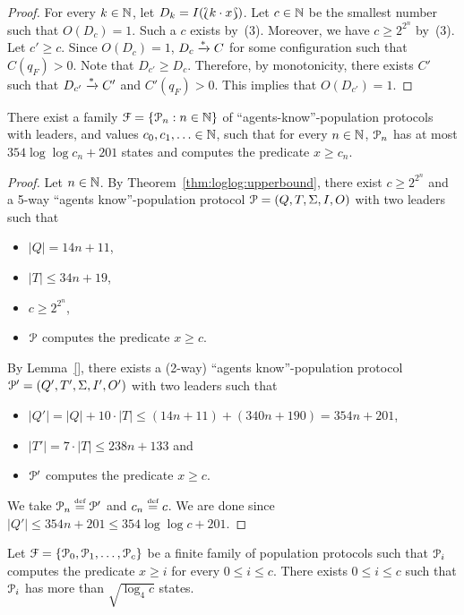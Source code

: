 \begin{proof}
  For every $k \in \mathbb{N}$, let $D_k = I(\Lbag k \cdot x\Rbag)$. Let $c
  \in \mathbb{N}$ be the smallest number such that $O(D_c) = 1$. Such a $c$
  exists by~(3). Moreover, we have $c \geq 2^{2^n}$ by~(3). Let $c'
  \geq c$. Since $O(D_c) = 1$, $D_c \xrightarrow{*} C$ for some
  configuration such that $C(q_F) > 0$. Note that $D_{c'} \geq
  D_c$. Therefore, by monotonicity, there exists $C'$ such that
  $D_{c'} \xrightarrow{*} C'$ and $C'(q_F) > 0$. This implies that
  $O(D_{c'}) = 1$.
\end{proof}

\begin{corollary}
  There exist a family $\mathcal{F} = \{\mathcal{P}_n : n \in \mathbb{N}\}$ of
  ``agents-know''-population protocols with leaders, and values $c_0,
  c_1, \ldots \in \mathbb{N}$, such that for every $n \in \mathbb{N}$, $\mathcal{P}_n$ has at
  most $354 \log\log c_n + 201$ states and computes the predicate $x
  \geq c_n$.
\end{corollary}

\begin{proof}
  Let $n \in \mathbb{N}$. By Theorem~\ref{thm:loglog:upperbound}, there exist
  $c \geq 2^{2^n}$ and a 5-way ``agents know''-population protocol
  $\mathcal{P} = (Q, T, \Sigma, I, O)$ with two leaders such that
  \begin{itemize}
    \item $|Q| = 14n + 11$,
    \item $|T| \leq 34n + 19$,
    \item $c \geq 2^{2^n}$,
    \item $\mathcal{P}$ computes the predicate $x \geq c$.
  \end{itemize}
  By Lemma~\ref{}, there exists a (2-way) ``agents know''-population
  protocol $\mathcal{P}' = (Q', T', \Sigma, I', O')$ with two leaders such
  that
  \begin{itemize}
  \item $|Q'| = |Q| + 10 \cdot |T| \leq (14n + 11) + (340n + 190) =
    354n + 201$,
  \item $|T'| = 7 \cdot |T| \leq 238n + 133$ and
  \item $\mathcal{P}'$ computes the predicate $x \geq c$.
  \end{itemize}
  We take $\mathcal{P}_n \stackrel{\scriptscriptstyle\text{def}}{=} \mathcal{P}'$ and $c_n \stackrel{\scriptscriptstyle\text{def}}{=} c$. We are done since
  $|Q'| \leq 354n + 201 \leq 354 \log\log c + 201$.
\end{proof}

\begin{theorem}
  Let $\mathcal{F} = \{\mathcal{P}_0, \mathcal{P}_1, \ldots, \mathcal{P}_c\}$ be a finite
  family of population protocols such that $\mathcal{P}_i$ computes the
  predicate $x \geq i$ for every $0 \leq i \leq c$. There exists $0
  \leq i \leq c$ such that $\mathcal{P}_i$ has more than $\sqrt{\log_4 c}$
  states.
\end{theorem}

